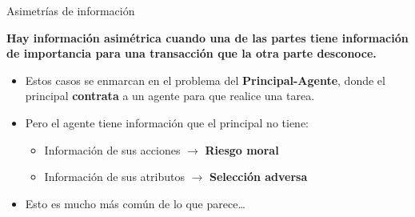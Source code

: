 \documentclass{beamer}
\begin{document}
\begin{frame}{Asimetrías de información}
    \begin{boxB}
        \centering
        \textbf{Hay información asimétrica cuando una de las partes tiene información de importancia para una transacción que la otra parte desconoce.}
    \end{boxB}
    \begin{itemize}
        \item Estos casos se enmarcan en el problema del \textbf{Principal-Agente}, donde el principal \textbf{contrata} a un agente para que realice una tarea.
        \item Pero el agente tiene información que el principal no tiene:
        \begin{itemize}
        \item Información de sus acciones $\rightarrow$ \textbf{Riesgo moral}
        \item Información de sus atributos $\rightarrow$ \textbf{Selección adversa}
        \end{itemize}
        \item Esto es mucho más común de lo que parece\dots
    \end{itemize}
\end{frame}
\end{document}
